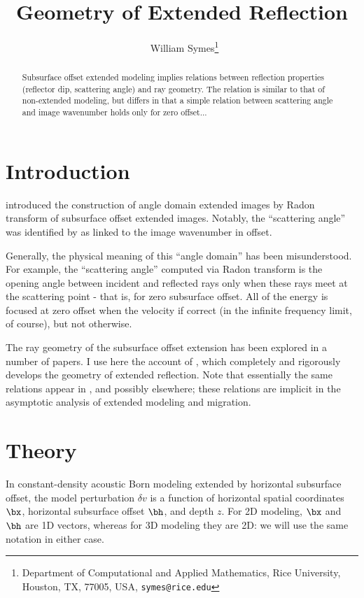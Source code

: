 \title{Geometry of Extended Reflection}
\author{
\ William Symes\thanks{Department of Computational and Applied Mathematics, Rice University,
Houston, TX, 77005, USA,
{\tt symes@rice.edu}}
}



\maketitle
\parskip 12pt

\begin{abstract}
Subsurface offset extended modeling implies relations between reflection properties (reflector dip, scattering angle) and ray geometry. The relation is similar to that of non-extended modeling, but differs in that a simple relation between scattering angle and image wavenumber holds only for zero offset...
\end{abstract}

\section{Introduction}
\cite{SavaFomel:03} introduced the construction of angle domain extended images by Radon transform of subsurface offset extended images. Notably, the ``scattering angle'' was identified by \cite{SavaFomel:03} as linked to the image wavenumber in offset. 

Generally, the physical meaning of this ``angle domain'' has been misunderstood. 
For example, the ``scattering angle'' computed via Radon transform is the opening angle between incident and reflected rays only when these rays meet at the scattering point - that is, for zero subsurface offset. All of the energy is focused at zero offset when the velocity if correct (in the infinite frequency limit, of course), but not otherwise. 

The ray geometry of the subsurface offset extension has been explored in a number of papers. I use here the account of \cite{HouSymes:15}, which completely and rigorously develops the geometry of extended reflection. Note that essentially the same relations appear in \cite{tenKroode:12}, and possibly elsewhere; these relations are implicit in the asymptotic analysis of extended modeling and migration.

\section{Theory}
In constant-density acoustic Born modeling extended by horizontal subsurface offset, the model perturbation $\delta v$ is a function of horizontal spatial coordinates $\bx$, horizontal subsurface offset $\bh$, and depth $z$. For 2D modeling, $\bx $ and $\bh $ are 1D vectors, whereas for 3D modeling they are 2D: we will use the same notation in either case.


